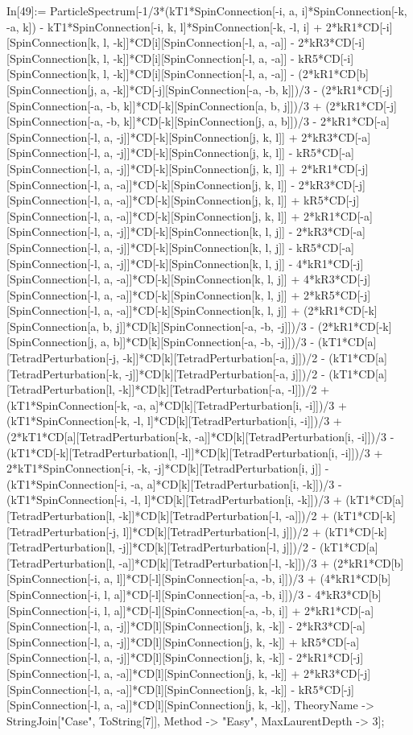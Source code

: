 In[49]:= ParticleSpectrum[-1/3*(kT1*SpinConnection[-i, a, i]*SpinConnection[-k, -a, k]) - kT1*SpinConnection[-i, k, l]*SpinConnection[-k, -l, i] + 2*kR1*CD[-i][SpinConnection[k, l, -k]]*CD[i][SpinConnection[-l, a, -a]] - 2*kR3*CD[-i][SpinConnection[k, l, -k]]*CD[i][SpinConnection[-l, a, -a]] - kR5*CD[-i][SpinConnection[k, l, -k]]*CD[i][SpinConnection[-l, a, -a]] - (2*kR1*CD[b][SpinConnection[j, a, -k]]*CD[-j][SpinConnection[-a, -b, k]])/3 - (2*kR1*CD[-j][SpinConnection[-a, -b, k]]*CD[-k][SpinConnection[a, b, j]])/3 + (2*kR1*CD[-j][SpinConnection[-a, -b, k]]*CD[-k][SpinConnection[j, a, b]])/3 - 2*kR1*CD[-a][SpinConnection[-l, a, -j]]*CD[-k][SpinConnection[j, k, l]] + 2*kR3*CD[-a][SpinConnection[-l, a, -j]]*CD[-k][SpinConnection[j, k, l]] - kR5*CD[-a][SpinConnection[-l, a, -j]]*CD[-k][SpinConnection[j, k, l]] + 2*kR1*CD[-j][SpinConnection[-l, a, -a]]*CD[-k][SpinConnection[j, k, l]] - 2*kR3*CD[-j][SpinConnection[-l, a, -a]]*CD[-k][SpinConnection[j, k, l]] + kR5*CD[-j][SpinConnection[-l, a, -a]]*CD[-k][SpinConnection[j, k, l]] + 2*kR1*CD[-a][SpinConnection[-l, a, -j]]*CD[-k][SpinConnection[k, l, j]] - 2*kR3*CD[-a][SpinConnection[-l, a, -j]]*CD[-k][SpinConnection[k, l, j]] - kR5*CD[-a][SpinConnection[-l, a, -j]]*CD[-k][SpinConnection[k, l, j]] - 4*kR1*CD[-j][SpinConnection[-l, a, -a]]*CD[-k][SpinConnection[k, l, j]] + 4*kR3*CD[-j][SpinConnection[-l, a, -a]]*CD[-k][SpinConnection[k, l, j]] + 2*kR5*CD[-j][SpinConnection[-l, a, -a]]*CD[-k][SpinConnection[k, l, j]] + (2*kR1*CD[-k][SpinConnection[a, b, j]]*CD[k][SpinConnection[-a, -b, -j]])/3 - (2*kR1*CD[-k][SpinConnection[j, a, b]]*CD[k][SpinConnection[-a, -b, -j]])/3 - (kT1*CD[a][TetradPerturbation[-j, -k]]*CD[k][TetradPerturbation[-a, j]])/2 - (kT1*CD[a][TetradPerturbation[-k, -j]]*CD[k][TetradPerturbation[-a, j]])/2 - (kT1*CD[a][TetradPerturbation[l, -k]]*CD[k][TetradPerturbation[-a, -l]])/2 + (kT1*SpinConnection[-k, -a, a]*CD[k][TetradPerturbation[i, -i]])/3 + (kT1*SpinConnection[-k, -l, l]*CD[k][TetradPerturbation[i, -i]])/3 + (2*kT1*CD[a][TetradPerturbation[-k, -a]]*CD[k][TetradPerturbation[i, -i]])/3 - (kT1*CD[-k][TetradPerturbation[l, -l]]*CD[k][TetradPerturbation[i, -i]])/3 + 2*kT1*SpinConnection[-i, -k, -j]*CD[k][TetradPerturbation[i, j]] - (kT1*SpinConnection[-i, -a, a]*CD[k][TetradPerturbation[i, -k]])/3 - (kT1*SpinConnection[-i, -l, l]*CD[k][TetradPerturbation[i, -k]])/3 + (kT1*CD[a][TetradPerturbation[l, -k]]*CD[k][TetradPerturbation[-l, -a]])/2 + (kT1*CD[-k][TetradPerturbation[-j, l]]*CD[k][TetradPerturbation[-l, j]])/2 + (kT1*CD[-k][TetradPerturbation[l, -j]]*CD[k][TetradPerturbation[-l, j]])/2 - (kT1*CD[a][TetradPerturbation[l, -a]]*CD[k][TetradPerturbation[-l, -k]])/3 + (2*kR1*CD[b][SpinConnection[-i, a, l]]*CD[-l][SpinConnection[-a, -b, i]])/3 + (4*kR1*CD[b][SpinConnection[-i, l, a]]*CD[-l][SpinConnection[-a, -b, i]])/3 - 4*kR3*CD[b][SpinConnection[-i, l, a]]*CD[-l][SpinConnection[-a, -b, i]] + 2*kR1*CD[-a][SpinConnection[-l, a, -j]]*CD[l][SpinConnection[j, k, -k]] - 2*kR3*CD[-a][SpinConnection[-l, a, -j]]*CD[l][SpinConnection[j, k, -k]] + kR5*CD[-a][SpinConnection[-l, a, -j]]*CD[l][SpinConnection[j, k, -k]] - 2*kR1*CD[-j][SpinConnection[-l, a, -a]]*CD[l][SpinConnection[j, k, -k]] + 2*kR3*CD[-j][SpinConnection[-l, a, -a]]*CD[l][SpinConnection[j, k, -k]] - kR5*CD[-j][SpinConnection[-l, a, -a]]*CD[l][SpinConnection[j, k, -k]], TheoryName -> StringJoin["Case", ToString[7]], Method -> "Easy", MaxLaurentDepth -> 3]; 